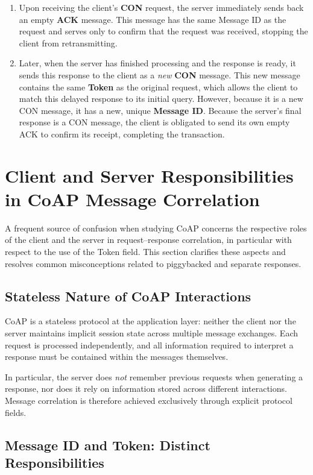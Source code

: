 \documentclass{scrbook}
\begin{document}
\begin{enumerate}
    \item Upon receiving the client's \textbf{CON} request, the server immediately sends back an empty \textbf{ACK} message. This message has the same Message ID as the request and serves only to confirm that the request was received, stopping the client from retransmitting.
    \item Later, when the server has finished processing and the response is ready, it sends this response to the client as a \textit{new} \textbf{CON} message. This new message contains the same \textbf{Token} as the original request, which allows the client to match this delayed response to its initial query. However, because it is a new CON message, it has a new, unique \textbf{Message ID}. Because the server's final response is a CON message, the client is obligated to send its own empty ACK to confirm its receipt, completing the transaction.
\end{enumerate}

\section{Client and Server Responsibilities in CoAP Message Correlation}

A frequent source of confusion when studying CoAP concerns the respective roles of the client and the server in request--response correlation, in particular with respect to the use of the Token field. This section clarifies these aspects and resolves common misconceptions related to piggybacked and separate responses.

\subsection{Stateless Nature of CoAP Interactions}

CoAP is a stateless protocol at the application layer: neither the client nor the server maintains implicit session state across multiple message exchanges. Each request is processed independently, and all information required to interpret a response must be contained within the messages themselves.

In particular, the server does \emph{not} remember previous requests when generating a response, nor does it rely on information stored across different interactions. Message correlation is therefore achieved exclusively through explicit protocol fields.

\subsection{Message ID and Token: Distinct Responsibilities}
\end{document}
